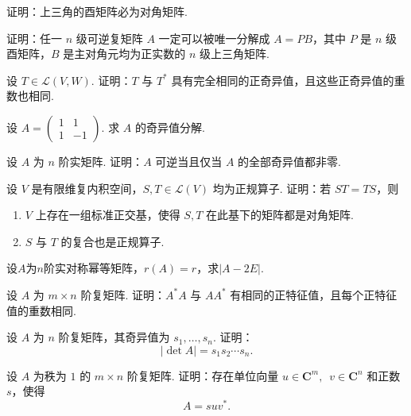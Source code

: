 \begin{exercise}

    \begin{exgroup}
        \item 证明：上三角的酉矩阵必为对角矩阵.

        \item 证明：任一 $ n $ 级可逆复矩阵 $ A $ 一定可以被唯一分解成 $ A = PB $，其中 $ P $ 是 $ n $ 级酉矩阵，$ B $ 是主对角元均为正实数的 $ n $ 级上三角矩阵.

        \item 设 $T \in \mathcal{L}(V, W)$. 证明：$T$ 与 $T^*$ 具有完全相同的正奇异值，且这些正奇异值的重数也相同.

        \item 设 $A = \begin{pmatrix}
            1 & 1 \\
            1 & -1
        \end{pmatrix}$. 求 $A$ 的奇异值分解.

        \item 设 $A$ 为 $n$ 阶实矩阵. 证明：$A$ 可逆当且仅当 $A$ 的全部奇异值都非零.
    \end{exgroup}

    \begin{exgroup}
        \item 设 $ V $ 是有限维复内积空间，$ S, T \in \mathcal{L}(V) $ 均为正规算子. 证明：若 $ ST = TS $，则
        \begin{enumerate}
            \item $ V $ 上存在一组标准正交基，使得 $ S, T $ 在此基下的矩阵都是对角矩阵.

            \item $ S $ 与 $ T $ 的复合也是正规算子.
        \end{enumerate}

        \item 设$A$为$n$阶实对称幂等矩阵，$r(A)=r$，求$|A-2E|$.

        \item 设 $A$ 为 $m \times n$ 阶复矩阵. 证明：$A^*A$ 与 $AA^*$ 有相同的正特征值，且每个正特征值的重数相同.

        \item 设 $A$ 为 $n$ 阶复矩阵，其奇异值为 $s_1, \ldots, s_n$. 证明：
        \[
            |\det A| = s_1s_2\cdots s_n.
        \]

        \item 设 $A$ 为秩为 $1$ 的 $m \times n$ 阶复矩阵. 证明：存在单位向量 $u \in \mathbf{C}^m,\enspace v \in \mathbf{C}^n$ 和正数 $s$，使得
            \[
                A = suv^*.
            \]


\end{exgroup}
\end{exercise}
